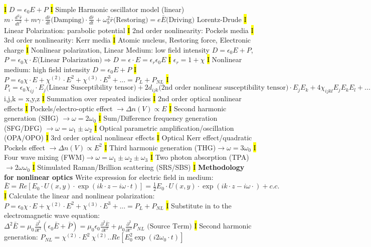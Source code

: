 \documentclass[fontsize=3]{scrartcl}
\begin{document}
\hl{I}
$D = \epsilon_0 E + P$
\hl{I}
Simple Harmonic oscillator model (linear)
$m \cdot \frac{d^2 \bar{r}}{dt^2} + m \gamma \cdot \frac{d \bar r}{dt} \text{(Damping)} \cdot \frac{d \bar r}{dt} + \omega_b^2 \bar r \text{(Restoring)} = e \bar E \text{(Driving)}$ Lorentz-Drude
\hl{I}
Linear Polarization: parabolic potential
\hl{I}
2nd order nonlinearity: Pockels media
\hl{I}
3rd order nonlinearity: Kerr media
\hl{I}
Atomic nucleus, Restoring force, Electronic charge
\hl{I}
Nonlinear polarization, Linear Medium: low field intensity $D = \epsilon_0 E + P$, $P= \epsilon_0 \chi \cdot E \text{(Linear Polarization)} \Rightarrow D = \epsilon \cdot E = \epsilon_r \epsilon_0 E$
\hl{I}
$\epsilon_r = 1 + \chi$ 
\hl{I}
Nonlinear medium: high field intensity
$D = \epsilon_0 E + P$
\hl{I}
$P = \epsilon_0 \chi \cdot E + \chi^{(2)} \cdot E^2 + \chi^{(3)} \cdot E^3 + ... = P_L + P_{NL}$
\hl{I}
$P_i = \epsilon_0 \chi_{ij} \cdot E_j \text{(Linear Susceptibility tensor)} + 2d_{ijk} \text{(2nd order nonlinear susceptibility tensor)} \cdot E_j E_k + 4\chi_{ijkl}E_j E_k E_l + ... = P_L + P_NL$ i,j,k = x,y,z
\hl{I}
Summation over repeated indicies
\hl{I}
2nd order optical nonlinear effects
\hl{I}
Pockels/electro-optic effect $\rightarrow \Delta n(V) \propto  E$
\hl{I}
Second harmonic generation (SHG) $\rightarrow \omega = 2\omega_0$
\hl{I}
Sum/Difference frequency generation (SFG/DFG) $\rightarrow \omega = \omega_1 \pm \omega_2$
\hl{I}
Optical parametric amplification/oscillation (OPA/OPO)
\hl{I}
3rd order optical nonlinear effects
\hl{I}
Optical Kerr effect/quadratic Pockels effect $\rightarrow \Delta n(V) \propto E^2$
\hl{I}
Third harmonic generation (THG)$\rightarrow \omega = 3\omega_0$
\hl{I}
Four wave mixing (FWM)$\rightarrow \omega = \omega_1 \pm \omega_2 \pm \omega_3$
\hl{I}
Two photon absorption (TPA) $\rightarrow 2\omega \omega_0$
\hl{I}
Stimulated Raman/Brillion scattering (SRS/SBS)
\hl{I}
\textbf{Methodology for nonlinear optics}
Write expression for electric field in medium: $\bar E = Re[E_0 \cdot U(x,y) \cdot \exp(ik \cdot z - i\omega \cdot t)] = \frac{1}{2} E_0 \cdot U(x,y) \cdot \exp(ik \cdot z - i \omega \cdot) + c.c.$
\hl{I}
Calculate the linear and nonlinear polarization: $P = \epsilon_0 \chi \cdot  E + \chi^{(2)} \cdot E^2 + \chi^{(3)} \cdot E^3 + ... = P_{L} + P_{NL}$
\hl{I}
Substitute in to the electromagnetic wave equation:
$\Delta^2 \bar{E} = \mu_0 \frac{\partial^2}{\partial t^2} (\epsilon_0 \bar{E} + \bar{P}) = \mu_0 \epsilon_0 \frac{\partial^2 \bar{E}}{\partial t^2} + \mu_0 \frac{\partial^2}{\partial t^2} P_{NL} \text{ (Source Term)}$
\hl{I} 
Second harmonic generation: $P_{NL} = \chi^{(2)} \cdot E^2 ~ \chi^{(2)} .. Re[E_0^2 \exp(i2\omega_0 \cdot t)]$
\end{document}
